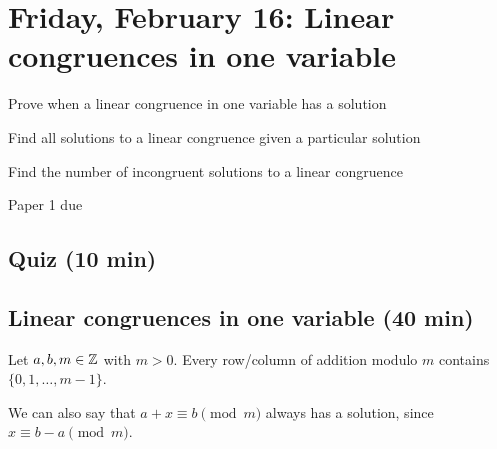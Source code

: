 \documentclass[letterpaper, 11 pt]{ximera}
\begin{document}
\section{Friday, February 16: Linear congruences in one variable}
\begin{obj}
	\item Prove when a linear congruence in one variable has a solution
	\item Find all solutions to a linear congruence given a particular solution
	\item Find the number of incongruent solutions to a linear congruence
\end{obj}

\begin{pre} \item Paper 1 due
\end{pre}
\subsection{Quiz (10 min)}

\subsection{Linear congruences in one variable (40 min)}
\begin{rem}\label{remark-add-inverse}
Let $a,b,m\in\mathbb Z$ with $m>0$. Every row/column of addition modulo $m$ contains $\{0,1,\dots,m-1\}$. 

We can also say that $a+x\equiv b\pmod m$ always has a solution, since $x\equiv b-a\pmod m$.
\end{rem}
\end{document}
